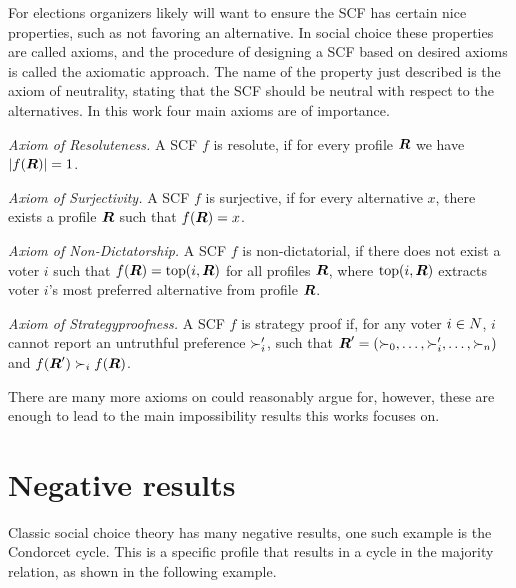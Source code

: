 For elections organizers likely will want to ensure the SCF has certain
nice properties, such as not favoring an alternative. In social choice these
properties are called axioms, and the procedure of designing a SCF based on
desired axioms is called the axiomatic approach. The name of the property just
described is the axiom of neutrality, stating that the SCF should be
neutral with respect to the alternatives. In this work four main axioms are of
importance.

\emph{Axiom of Resoluteness.} A SCF $f$ is resolute, if for every profile
$\boldsymbol{R}$ we have $|f(\boldsymbol{R})| = 1$.

\emph{Axiom of Surjectivity.} A SCF $f$ is surjective, if for every alternative
$x$, there exists a profile $\boldsymbol{R}$ such that
$f(\boldsymbol{R}) = x$.

\emph{Axiom of Non-Dictatorship.} A SCF $f$ is non-dictatorial, if there does not exist a voter $i$ such that $f(\boldsymbol{R}) = \textnormal{top}(i,\boldsymbol{R})$ for all profiles $\boldsymbol{R}$, where $\textnormal{top}(i,\boldsymbol{R})$  extracts voter $i$'s most preferred alternative from profile $\boldsymbol{R}$.

\emph{Axiom of Strategyproofness.} A SCF $f$ is strategy proof if, for any
voter $i \in N$, $i$ cannot report an untruthful preference
$\succ_i'$, such that  $\boldsymbol{R}' = (\succ_{0}, \dots,
	\succ_{i}', \dots, \succ_{n})$ and $f(\boldsymbol{R}') \succ_i
	f(\boldsymbol{R})$.

There are many more axioms on could reasonably argue for, however, these are
enough to lead to the main impossibility results this works focuses on.

\section{Negative results}
\label{preliminaries: negative results}

Classic social choice theory has many negative results, one such example is the
Condorcet cycle. This is a specific profile that results in a cycle in the
majority relation, as shown in the following example.

